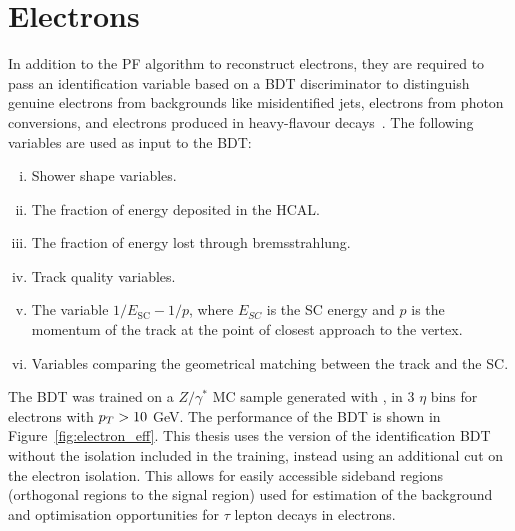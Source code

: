 \section{Electrons}

In addition to the \ac{PF} algorithm to reconstruct electrons, they are required to pass an identification variable based on a \ac{BDT} discriminator to distinguish genuine electrons from backgrounds like misidentified jets, electrons from photon conversions, and electrons produced in heavy-flavour decays~\cite{CMS:2015xaf}.
The following variables are used as input to the \ac{BDT}:

\begin{enumerate}[i)]
\item Shower shape variables.
\item The fraction of energy deposited in the \ac{HCAL}.
\item The fraction of energy lost through bremsstrahlung.
\item Track quality variables.
\item The variable $1/E_{\text{SC}} - 1/p$, where $E_{SC}$ is the \ac{SC} energy and $p$ is the momentum of the track at the point of closest approach to the vertex.
\item Variables comparing the geometrical matching between the track and the \ac{SC}.
\end{enumerate}

The \ac{BDT} was trained on a $Z/\gamma^{*}$ \ac{MC} sample generated with \MADGRAPH, in 3 $\eta$ bins for electrons with $p_{T}>10$ GeV.
The performance of the \ac{BDT} is shown in Figure~\ref{fig:electron_eff}.
This thesis uses the version of the identification \ac{BDT} without the isolation included in the training, instead using an additional cut on the electron isolation. 
This allows for easily accessible sideband regions (orthogonal regions to the signal region) used for estimation of the background and optimisation opportunities for $\tau$ lepton decays in electrons. \\

